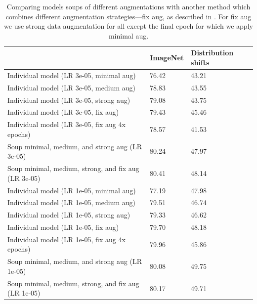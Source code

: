 \documentclass[nohyperref]{article}
\theoremstyle{plain}
\theoremstyle{definition}
\theoremstyle{remark}
\begin{document}
    
    \begin{table}
        \caption{Comparing models soups of different augmentations with
        another method which combines different augmentation 
        strategies---fix aug, as described in \citet{fixaug}.
        For fix aug we use strong data augmentation for all
        except the final epoch for which we apply minimal aug.}
        \begin{center}\footnotesize
        \setlength{\arrayrulewidth}{.01em}
        \begin{tabular}{lll}
            \toprule
            {} &              ImageNet &            Distribution shifts \\
            \midrule
            Individual model (LR 3e-05, minimal aug)           &  76.42 &  43.21 \\
            Individual model (LR 3e-05,  medium aug)           &  78.83 &  43.55 \\
            Individual model (LR 3e-05, strong aug)        &  79.08 &  43.75 \\
            Individual model (LR 3e-05, fix aug)           &  79.43 &  45.46 \\
            Individual model (LR 3e-05, fix aug 4x epochs) &  78.57 &  41.53 \\
            Soup minimal, medium, and strong aug (LR 3e-05)             &  80.24 &  47.97 \\
            Soup minimal, medium, strong, and fix aug (LR 3e-05)         &  80.41 &  48.14 \\
            \midrule
            Individual model (LR 1e-05, minimal aug)           &  77.19 &  47.98 \\
            Individual model (LR 1e-05,  medium aug)           &  79.51 &  46.74 \\
            Individual model (LR 1e-05, strong aug)        &  79.33 &  46.62 \\
            Individual model (LR 1e-05, fix aug)           &  79.70 &  48.18 \\
            Individual model (LR 1e-05, fix aug 4x epochs) &  79.96 &  45.86 \\
            Soup minimal, medium, and strong aug (LR 1e-05)             &  80.08 &  49.75 \\
            Soup minimal, medium, strong, and fix aug (LR 1e-05)         &  80.17 &  49.71 \\
            \bottomrule
            \end{tabular}
        \end{center}
        \label{tab:fixaug}
    \end{table}
    
\end{document}
